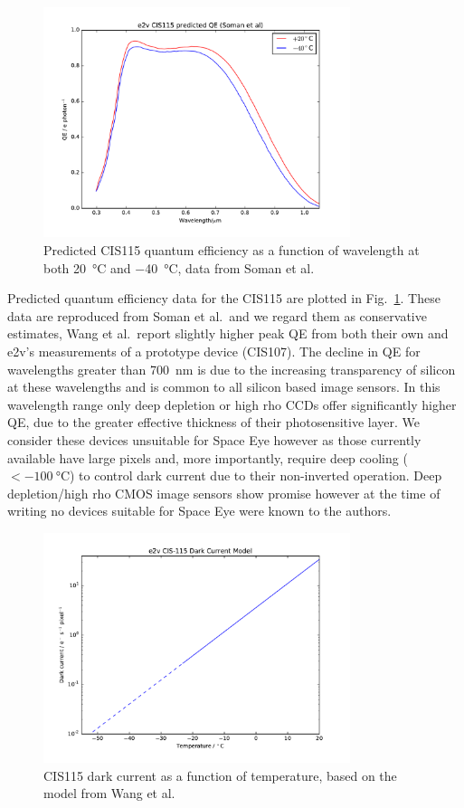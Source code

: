 \documentclass[]{iac}
\begin{document}
\begin{figure}[tp]
  \center
  \includegraphics[width=0.8\textwidth]{figures/CIS115QE.pdf}
  \caption{\label{fig:qe}Predicted CIS115 quantum efficiency as a function of wavelength at both \SI{+20}{\celsius} and
    \SI{-40}{\celsius}, data from Soman et al.\cite{Soman2014}}
\end{figure}

Predicted quantum efficiency data for the CIS115 are plotted in Fig.~\ref{fig:qe}. These data are reproduced from Soman
et al.\cite{Soman2014}\ and we regard them as conservative estimates, Wang et al.\cite{Wang2014}\ report slightly higher
peak QE from both their own and e2v's measurements of a prototype device (CIS107). The decline in QE for wavelengths
greater than \SI{700}{\nano\metre} is due to the increasing transparency of silicon at these wavelengths and is common
to all silicon based image sensors. In this wavelength range only deep depletion or high rho CCDs offer significantly
higher QE, due to the greater effective thickness of their photosensitive layer. We consider these devices unsuitable
for Space Eye however as those currently available have large pixels and, more importantly, require deep cooling
($<\SI{-100}{\celsius}$) to control dark current due to their non-inverted operation. Deep depletion/high rho CMOS image
sensors show promise however at the time of writing no devices suitable for Space Eye were known to the authors.

\begin{figure}[tp]
  \center \includegraphics[width=0.8\textwidth]{figures/CIS115DC.pdf}
  \caption{\label{fig:dc}CIS115 dark current as a function of temperature, based on the model from Wang et al.
    \cite{Wang2014}}
\end{figure}
\end{document}
